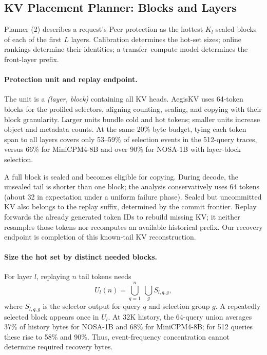 \subsection{KV Placement Planner: Blocks and Layers}
\label{sec:kv-placement}

Planner (2) describes a request's Peer protection as the hottest $K_l$
sealed blocks of each of the first $L$ layers. Calibration determines
the hot-set sizes; online rankings determine their identities; a
transfer--compute model determines the front-layer prefix.

\paragraph{Protection unit and replay endpoint.}
The unit is a \emph{(layer, block)} containing all KV heads. AegisKV uses
64-token blocks for the profiled selectors, aligning counting, sealing,
and copying with their block granularity. Larger units bundle cold and
hot tokens; smaller units increase object and metadata counts.
At the same 20\% byte budget, tying each token span to all layers covers
only 53--59\% of selection events in the 512-query traces, versus 66\%
for MiniCPM4-8B and over 90\% for NOSA-1B with layer-block selection.

A full block is sealed and becomes eligible for copying. During decode,
the unsealed tail is shorter than one block; the analysis conservatively
uses 64 tokens (about 32 in expectation under a uniform failure phase).
Sealed but uncommitted KV also belongs to the replay suffix, determined
by the commit frontier. Replay forwards the already generated token IDs
to rebuild missing KV; it neither resamples those tokens nor recomputes
an available historical prefix. Our recovery endpoint is completion of
this known-tail KV reconstruction.

\paragraph{Size the hot set by distinct needed blocks.}
For layer $l$, replaying $n$ tail tokens needs
\begin{equation}
 U_l(n)=\bigcup_{q=1}^{n}\ \bigcup_g S_{l,q,g},
\end{equation}
where $S_{l,q,g}$ is the selector output for query $q$ and selection
group $g$. A repeatedly selected block appears once in $U_l$.
At 32K history, the 64-query union averages 37\% of history bytes for
NOSA-1B and 68\% for MiniCPM4-8B; for 512 queries these rise to 58\%
and 90\%. Thus, event-frequency concentration cannot determine required
recovery bytes.

